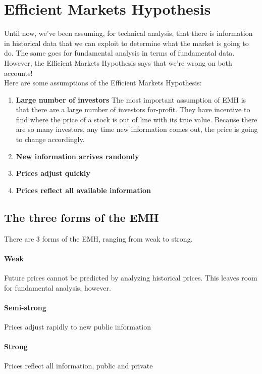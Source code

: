 \section{Efficient Markets Hypothesis}
\noindent Until now, we've been assuming, for technical analysis, that there is information in historical data that we can exploit to determine what the market is going to do. The same goes for fundamental analysis in terms of fundamental data. However, the Efficient Markets Hypothesis says that we're wrong on both accounts!\\

\noindent Here are some assumptions of the Efficient Markets Hypothesis:

\begin{enumerate}
	\item \textbf{Large number of investors} The most important assumption of EMH is that there are a large number of investors for-profit. They have incentive to find where the price of a stock is out of line with its true value. Because there are so many investors, any time new information comes out, the price is going to change accordingly.
    
    \item \textbf{New information arrives randomly} 
    \item \textbf{Prices adjust quickly}
    \item \textbf{Prices reflect all available information}
\end{enumerate}

\subsection{The three forms of the EMH}
\noindent There are 3 forms of the EMH, ranging from weak to strong.

\paragraph{Weak} Future prices cannot be predicted by analyzing historical prices. This leaves room for fundamental analysis, however.
\paragraph{Semi-strong} Prices adjust rapidly to new public information
\paragraph{Strong} Prices reflect all information, public and private
